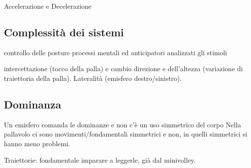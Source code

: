 Accelerazione e Decelerazione

\subsection{Complessità dei sistemi}
controllo delle posture
processi mentali ed anticipatori analizzati gli stimoli

intercettazione (tocco della palla) e cambio direzione e dell’altezza (variazione di traiettoria della palla). Lateralità (emisfero destro/sinistro).

\subsection{Dominanza}
Un emisfero comanda le dominanze e non c’è un uso simmetrico del corpo
Nella pallavolo ci sono movimenti/fondamentali simmetrici e non, in quelli simmetrici si hanno meno problemi.

Traiettorie: fondamentale imparare a leggerle, già dal minivolley.

